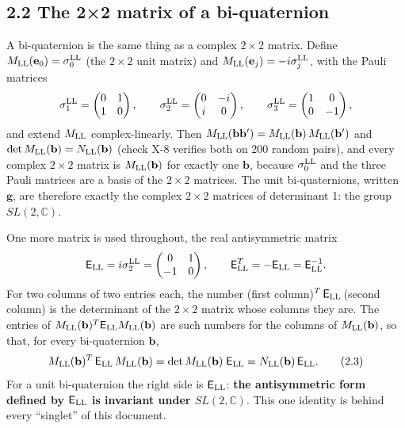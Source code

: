 \documentclass[
  10pt,
]{article}
\begin{document}
\hypertarget{the-22-matrix-of-a-bi-quaternion}{%
\subsection{2.2 The 2×2 matrix of a
bi-quaternion}\label{the-22-matrix-of-a-bi-quaternion}}

A bi-quaternion is the same thing as a complex \(2\times2\) matrix.
Define \(M_{\rm LL}(\mathbf e_0)=\sigma^{\rm LL}_0\) (the \(2\times2\)
unit matrix) and \(M_{\rm LL}(\mathbf e_j)=-i\sigma^{\rm LL}_j\), with
the Pauli matrices
\[\sigma^{\rm LL}_1=\begin{pmatrix}0&1\\1&0\end{pmatrix},\qquad\sigma^{\rm LL}_2=\begin{pmatrix}0&-i\\i&0\end{pmatrix},\qquad\sigma^{\rm LL}_3=\begin{pmatrix}1&0\\0&-1\end{pmatrix},\]
and extend \(M_{\rm LL}\) complex-linearly. Then
\(M_{\rm LL}(\mathbf b\mathbf b')=M_{\rm LL}(\mathbf b)\,M_{\rm LL}(\mathbf b')\)
and \(\det M_{\rm LL}(\mathbf b)=N_{\rm LL}(\mathbf b)\) (check X-8
verifies both on 200 random pairs), and every complex \(2\times2\)
matrix is \(M_{\rm LL}(\mathbf b)\) for exactly one \(\mathbf b\),
because \(\sigma^{\rm LL}_0\) and the three Pauli matrices are a basis
of the \(2\times2\) matrices. The unit bi-quaternions, written
\(\mathbf g\), are therefore exactly the complex \(2\times2\) matrices
of determinant 1: the group \(SL(2,\mathbb C)\).

One more matrix is used throughout, the real antisymmetric matrix
\[\mathsf E_{\rm LL}=i\sigma^{\rm LL}_2=\begin{pmatrix}0&1\\-1&0\end{pmatrix},\qquad\mathsf E_{\rm LL}^T=-\mathsf E_{\rm LL}=\mathsf E_{\rm LL}^{-1}.\]
For two columns of two entries each, the number (first
column)\(^T\,\mathsf E_{\rm LL}\,\)(second column) is the determinant of
the \(2\times2\) matrix whose columns they are. The entries of
\(M_{\rm LL}(\mathbf b)^T\mathsf E_{\rm LL}M_{\rm LL}(\mathbf b)\) are
such numbers for the columns of \(M_{\rm LL}(\mathbf b)\), so that, for
every bi-quaternion \(\mathbf b\),
\[M_{\rm LL}(\mathbf b)^T\,\mathsf E_{\rm LL}\,M_{\rm LL}(\mathbf b)=\det M_{\rm LL}(\mathbf b)\;\mathsf E_{\rm LL}=N_{\rm LL}(\mathbf b)\,\mathsf E_{\rm LL}. \tag{2.3}\]
For a unit bi-quaternion the right side is \(\mathsf E_{\rm LL}\):
\textbf{the antisymmetric form defined by \(\mathsf E_{\rm LL}\) is
invariant under \(SL(2,\mathbb C)\)}. This one identity is behind every
``singlet'' of this document.
\end{document}
